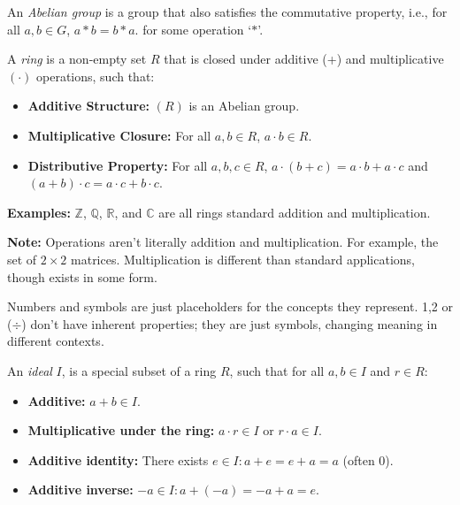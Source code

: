\begin{Def}

    An \textit{Abelian group} is a group that also satisfies the commutative property, i.e., for all $a,b\in G$, $a*b=b*a$.
    for some operation `$*$'.

\end{Def}

\begin{Def}[Ring]

    A \textit{ring} is a non-empty set $R$ that is closed under additive (+) and multiplicative $(\cdot)$ operations, such that:
    \begin{itemize}
        \item \textbf{Additive Structure:} $(R)$ is an Abelian group.
        \item \textbf{Multiplicative Closure:} For all $a,b\in R$, $a\cdot b\in R$.
        \item \textbf{Distributive Property:} For all $a,b,c\in R$, $a\cdot(b+c)=a\cdot b+a\cdot c$ and $(a+b)\cdot c=a\cdot c+b\cdot c$.
    \end{itemize}
\end{Def}

\noindent
\textbf{Examples:} $\mathbb{Z}$, $\mathbb{Q}$, $\mathbb{R}$, and $\mathbb{C}$ are all rings standard addition and multiplication.\\

\begin{Note}
    \textbf{Note:} Operations aren't literally addition and multiplication. For example,
    the set of $2\times2$ matrices. Multiplication is different than standard applications, though exists in some form.
\end{Note}
\begin{Tip}
    Numbers and symbols are just placeholders for the concepts they represent.
    1,2 or ($\div$) don't have inherent properties; they are just symbols, changing meaning
    in different contexts.
\end{Tip}

\newpage

\begin{Def}[Ideal]

    \label{def:ideal}

    An \textit{ideal} $I$, is a special subset of a ring $R$, such that for all $a,b\in I$ and $r\in R$:
    \begin{itemize}
        \item \textbf{Additive:} $a+b\in I$.
        \item \textbf{Multiplicative under the ring:} $a\cdot r\in I$ or $r\cdot a\in I$.
        \item \textbf{Additive identity:} There exists $e\in I:a+e=e+a=a$ (often 0).
        \item \textbf{Additive inverse:} $-a\in I:a+(-a)=-a+a=e$.
    \end{itemize}
\end{Def}

